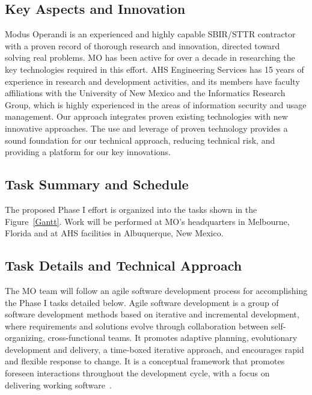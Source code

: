 \documentclass{sbir}
\begin{document}
\subsection{Key Aspects and Innovation}
Modus Operandi is an experienced and highly capable SBIR/STTR contractor with a proven record of thorough research and innovation, directed toward solving real problems. MO has been active for over a decade in researching the key technologies required in this effort. AHS Engineering Services has 15 years of experience in research and development activities, and its members have faculty affiliations with the University of New Mexico and the Informatics Research Group, which is highly experienced in the areas of information security and usage management. Our approach integrates proven existing technologies with new innovative approaches. The use and leverage of proven technology provides a sound foundation for our technical approach, reducing technical risk, and providing a platform for our key innovations.

\subsection{Task Summary and Schedule}
The proposed Phase I effort is organized into the tasks shown in the Figure~\ref{Gantt}. Work will be performed at MO's headquarters in Melbourne, Florida and at AHS facilities in Albuquerque, New Mexico.

\begin{center}
\end{center}

\subsection{Task Details and Technical Approach}
The MO team will follow an agile software development process for accomplishing the Phase I tasks detailed below. Agile software development is a group of software development methods based on iterative and incremental development, where requirements and solutions evolve through collaboration between self-organizing, cross-functional teams. It promotes adaptive planning, evolutionary development and delivery, a time-boxed iterative approach, and encourages rapid and flexible response to change. It is a conceptual framework that promotes foreseen interactions throughout the development cycle, with a focus on delivering working software~\cite{La:03}.
\end{document}
